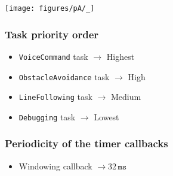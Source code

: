 \vspace*{-2em}
\begin{figure*}[htbp]
    \centering
    \begin{minipage}{0.45\linewidth}
        \centering
        \texttt{[image: figures/pA/\_]}
    \end{minipage}
    \hfill
    \begin{minipage}{0.49\linewidth}
        \subsubsection*{Task priority order}
        \vspace*{-1em}
        \begin{itemize}[noitemsep, topsep=0pt, partopsep=0pt, parsep=0pt]
            \item \texttt{VoiceCommand} task \( \to \) Highest
            \item \texttt{ObstacleAvoidance} task \( \to \) High
            \item \texttt{LineFollowing} task \( \to \) Medium
            \item \texttt{Debugging} task \( \to \) Lowest
        \end{itemize}

        \subsubsection*{Periodicity of the timer callbacks}
        \vspace*{-1em}
        \begin{itemize}[noitemsep, topsep=0pt, partopsep=0pt, parsep=0pt]
            \item Windowing callback \( \to 32\,\texttt{ms} \)
        \end{itemize}
    \end{minipage}
\end{figure*}
